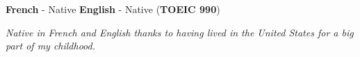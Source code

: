 
\begin{cvspacedparagraph}

  \textbf{French} - Native \hspace*{\fill} \textbf{English} - Native (\textbf{TOEIC 990})

  \vspace{3pt}

  \textit{Native in French and English thanks to having lived in the United States for a big part of my childhood.}
\end{cvspacedparagraph}